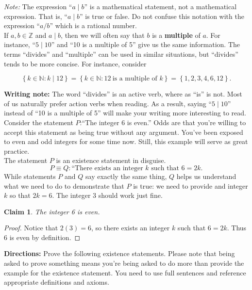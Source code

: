 \documentclass[12 pt]{article}
\newcommand{\Z}{\mathbb{Z}}
\newcommand{\N}{\mathbb{N}}
\newcommand{\set}[1]{\left\{#1\right\}}
\newcommand{\divides}{\! \mid \!}
\theoremstyle{definition}
\theoremstyle{plain}
\theoremstyle{mytheorem}
\newtheorem{claim}{Claim}
\theoremstyle{myexample}
\theoremstyle{mydefinition}
\begin{document}
\noindent \textit{Note:} The expression ``$a \divides b$'' is a mathematical statement, not a mathematical expression.  That is, ``$a \divides b$'' is true or false.  Do not confuse this notation with the expression ``$a/b$'' which is a rational number.\\

\noindent  If $a,b \in \Z$ and $a \divides b$, then we will often say that $b$ is a \textbf{multiple} of $a$.  For instance, ``$5 \divides 10$'' and ``10 is a multiple of 5'' give us the same information.  The terms ``divides'' and ``multiple'' can be used in similar situations, but ``divides'' tends to be more concise.  For instance, consider

\[\set{k \in \N : k \divides 12} = \set{k \in \N : 12 \ \text{is a multiple of }k} = \set{1,2,3,4,6,12}.\]

\noindent \textbf{Writing note:}  The word ``divides'' is an active verb, where as ``is'' is not.  Most of us naturally prefer action verbs when reading.  As a result, saying ``$5 \divides 10$'' instead of ``10 is a multiple of 5'' will make your writing more interesting to read.\\

\noindent Consider the statement $P$:``The integer 6 is even.''  Odds are that you're willing to accept this statement as being true without any argument.  You've been exposed to even and odd integers for some time now.  Still, this example will serve as great practice.  \\

\noindent The statement $P$ is an existence statement in disguise.  
\[P \equiv Q:\text{``There exists an integer $k$ such that $6=2k$.}\]
While statements $P$ and $Q$ say exactly the same thing, $Q$ helps us understand what we need to do to demonstrate that $P$ is true: we need to provide and integer $k$ so that $2k=6$.  The integer $3$ should work just fine.

\begin{claim} The integer 6 is even.
\end{claim}
\begin{proof}
Notice that $2(3)=6$, so there exists an integer $k$ such that $6=2k$.  Thus 6 is even by definition.
\end{proof}

\noindent \textbf{Directions:} Prove the following existence statements.  Please note that being asked to prove something means you're being asked to do more than provide the example for the existence statement.  You need to use full sentences and reference appropriate definitions and axioms.
\end{document}

